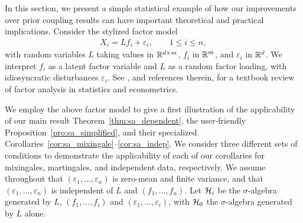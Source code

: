 In this section, we present a simple statistical example of how our
improvements over prior coupling results can have important theoretical and
practical implications. Consider the stylized factor model
%
\begin{align*}
  X_i = L f_i + \varepsilon_i, \qquad 1 \leq i \leq n,
\end{align*}
%
with random variables $L$ taking values in $\mathbb{R}^{d \times m}$, $f_i$ in $\mathbb{R}^m$,
and $\varepsilon_i$ in $\mathbb{R}^d$. We interpret $f_i$ as a latent factor variable
and $L$ as a random factor loading, with idiosyncratic disturbances
$\varepsilon_i$. See \citet{fan2020statistical}, and references therein, for a
textbook review of factor analysis in statistics and econometrics.

We employ the above factor model to give a first illustration of the
applicability of our main result Theorem~\ref{thm:sa_dependent}, the
user-friendly Proposition~\ref{pro:sa_simplified}, and their specialized
Corollaries~\ref{cor:sa_mixingale}--\ref{cor:sa_indep}. We
consider three different sets of conditions to demonstrate the applicability of
each of our corollaries for mixingales, martingales, and independent data,
respectively. We assume throughout that
$(\varepsilon_1, \ldots, \varepsilon_n)$ is zero-mean and finite variance, and
that $(\varepsilon_1, \ldots, \varepsilon_n)$ is independent
of $L$ and $(f_1, \ldots, f_n)$. Let $\mathcal{H}_i$ be the $\sigma$-algebra generated
by $L$, $(f_1, \ldots, f_i)$ and $(\varepsilon_1, \ldots, \varepsilon_i)$, with
$\mathcal{H}_0$ the $\sigma$-algebra generated by $L$ alone.

